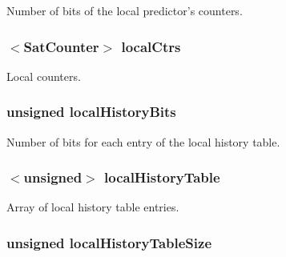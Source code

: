 \label{classTournamentBP_a815998927bcd79afe7f787b90f9954f5}
Number of bits of the local predictor's counters. \hypertarget{classTournamentBP_a639a100e0452520604d19db58d98721d}{
\subsubsection[{localCtrs}]{$<${\bf SatCounter}$>$ {\bf localCtrs}}}
\label{classTournamentBP_a639a100e0452520604d19db58d98721d}
Local counters. \hypertarget{classTournamentBP_affb9008b5a92be8b47d319a4ecc28683}{
\subsubsection[{localHistoryBits}]{\setlength{\rightskip}{0pt plus 5cm}unsigned {\bf localHistoryBits}}}
\label{classTournamentBP_affb9008b5a92be8b47d319a4ecc28683}
Number of bits for each entry of the local history table. \hypertarget{classTournamentBP_a0cd7dde45fcd92a2f25e895f8232007e}{
\subsubsection[{localHistoryTable}]{$<$unsigned$>$ {\bf localHistoryTable}}}
\label{classTournamentBP_a0cd7dde45fcd92a2f25e895f8232007e}
Array of local history table entries. \hypertarget{classTournamentBP_a71759b087accf553cc72b42bbd20dacd}{
\subsubsection[{localHistoryTableSize}]{\setlength{\rightskip}{0pt plus 5cm}unsigned {\bf localHistoryTableSize}}}
